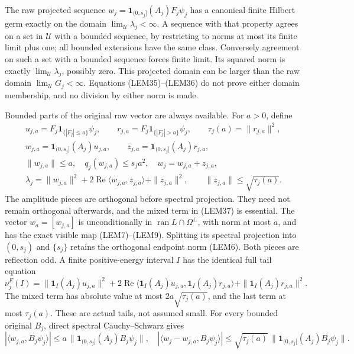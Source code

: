\documentclass[11pt]{article}
\begin{document}
The raw projected sequence \(w_j=\mathbf1_{(0,s_j]}(A_j)F_j\psi_j\) has a canonical finite Hilbert germ exactly on the domain \(\lim_{\mathcal U}\lambda_j<\infty\). A sequence with that property agrees on a set in \(\mathcal U\) with a bounded sequence, by restricting to norms at most its finite limit plus one; all bounded extensions have the same class. Conversely agreement on such a set with a bounded sequence forces finite limit. Its squared norm is exactly \(\lim_{\mathcal U}\lambda_j\), possibly zero. This projected domain can be larger than the raw domain \(\lim_{\mathcal U}G_j<\infty\). Equations (LEM35)–(LEM36) do not prove either domain membership, and no division by either norm is made.

Bounded parts of the original raw vector are always available. For \(a>0\), define
\[
\begin{gathered}
u_{j,a}=F_j\mathbf1_{\{|F_j|\le a\}}\psi_j,\qquad
r_{j,a}=F_j\mathbf1_{\{|F_j|>a\}}\psi_j,\qquad
\tau_j(a)=\|r_{j,a}\|^2,\\
w_{j,a}=\mathbf1_{(0,s_j]}(A_j)u_{j,a},\qquad
z_{j,a}=\mathbf1_{(0,s_j]}(A_j)r_{j,a},\\
\|w_{j,a}\|\le a,\quad q_j(w_{j,a})\le s_ja^2,\quad
w_j=w_{j,a}+z_{j,a},\\
\lambda_j=\|w_{j,a}\|^2+2\operatorname{Re}\langle w_{j,a},z_{j,a}\rangle
                       +\|z_{j,a}\|^2,\qquad
\|z_{j,a}\|\le\sqrt{\tau_j(a)}.
\end{gathered}\tag{LEM37}
\]
The amplitude pieces are orthogonal before spectral projection. They need not remain orthogonal afterwards, and the mixed term in (LEM37) is essential. The vector \(w_a=[w_{j,a}]\) is unconditionally in \(\operatorname{ran}L\cap\Omega^\perp\), with norm at most \(a\), and has the exact visible map (LEM7)–(LEM9). Splitting its spectral projection into \((0,s_j)\) and \(\{s_j\}\) retains the orthogonal endpoint norm (LEM6). Both pieces are reflection odd. A finite positive-energy interval \(I\) has the identical full tail equation
\[
\nu_j^F(I)=\|\mathbf1_I(A_j)u_{j,a}\|^2
 +2\operatorname{Re}\langle\mathbf1_I(A_j)u_{j,a},
                                  \mathbf1_I(A_j)r_{j,a}\rangle
 +\|\mathbf1_I(A_j)r_{j,a}\|^2.
\tag{LEM38}
\]
The mixed term has absolute value at most \(2a\sqrt{\tau_j(a)}\), and the last term at most \(\tau_j(a)\). These are actual tails, not assumed small. For every bounded original \(B_j\), direct spectral Cauchy–Schwarz gives
\[
|\langle w_{j,a},B_j\psi_j\rangle|
\le a\,\|\mathbf1_{(0,s_j]}(A_j)B_j\psi_j\|,
\quad
|\langle w_j-w_{j,a},B_j\psi_j\rangle|
\le\sqrt{\tau_j(a)}\,\|\mathbf1_{(0,s_j]}(A_j)B_j\psi_j\|.
\tag{LEM39}
\]
\end{document}
